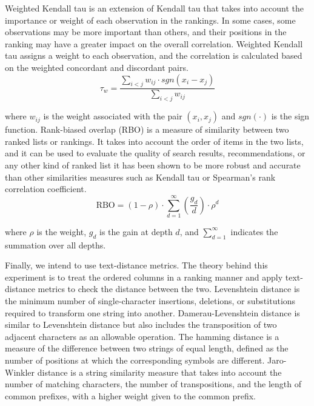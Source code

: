 Weighted Kendall tau  \cite{vignaWeightedCorrelationIndex2015} is an extension of Kendall tau that takes into account the importance or weight of each observation in the rankings. In some cases, some observations may be more important than others, and their positions in the ranking may have a greater impact on the overall correlation. Weighted Kendall tau assigns a weight to each observation, and the correlation is calculated based on the weighted concordant and discordant pairs.
\begin{equation}
\tau_w = \frac{{\sum_{i<j} w_{ij} \cdot sgn(x_i - x_j)}}{{\sum_{i<j} w_{ij}}}
\end{equation}

where $w_{ij}$ is the weight associated with the pair $(x_i, x_j)$ and $sgn(\cdot)$ is the sign function.
Rank-biased overlap (RBO) \cite{webberSimilarityMeasureIndefinite2010} is a measure of similarity between two ranked lists or rankings. It takes into account the order of items in the two lists, and it can be used to evaluate the quality of search results, recommendations, or any other kind of ranked list it has been shown to be more robust and accurate than other similarities measures such as Kendall tau or Spearman's rank correlation coefficient. 
\begin{equation}
\text{{RBO}} = (1 - \rho) \cdot \sum_{d=1}^{\infty} \left( \frac{{g_d}}{{d}} \right) \cdot \rho^d
\end{equation}

where $\rho$ is the weight, $g_d$ is the gain at depth $d$, and $\sum_{d=1}^{\infty}$ indicates the summation over all depths.


Finally, we intend to use text-distance metrics. The theory behind this experiment is to treat the ordered columns in a ranking manner and apply text-distance metrics to check the distance between the two. Levenshtein distance \cite{navarroGuidedTourApproximate2001} is the minimum number of single-character insertions, deletions, or substitutions required to transform one string into another. Damerau-Levenshtein distance \cite{navarroGuidedTourApproximate2001} is similar to Levenshtein distance but also includes the transposition of two adjacent characters as an allowable operation. The hamming distance \cite{6772729} is a measure of the difference between two strings of equal length, defined as the number of positions at which the corresponding symbols are different. Jaro-Winkler distance \cite{navarroGuidedTourApproximate2001} is a string similarity measure that takes into account the number of matching characters, the number of transpositions, and the length of common prefixes, with a higher weight given to the common prefix.




